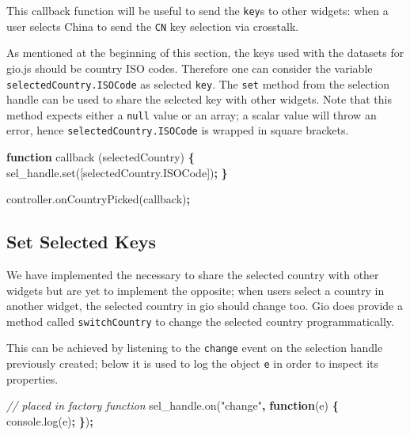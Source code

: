 \documentclass[10pt,]{krantz}
\makeatletter
\newenvironment{Shaded}{\begin{snugshade}}{\end{snugshade}}
\newcommand{\AttributeTok}[1]{\textcolor[rgb]{0.61,0.61,0.61}{#1}}
\newcommand{\CommentTok}[1]{\textcolor[rgb]{0.37,0.37,0.37}{\textit{#1}}}
\newcommand{\KeywordTok}[1]{\textcolor[rgb]{0.27,0.27,0.27}{\textbf{#1}}}
\newcommand{\NormalTok}[1]{#1}
\newcommand{\OperatorTok}[1]{\textcolor[rgb]{0.43,0.43,0.43}{\textbf{#1}}}
\newcommand{\StringTok}[1]{\textcolor[rgb]{0.5,0.5,0.5}{#1}}
\newcommand{\VariableTok}[1]{\textcolor[rgb]{0,0,0}{#1}}
\newenvironment{kframe}{%
\medskip{}
\setlength{\fboxsep}{.8em}
 \def\at@end@of@kframe{}%
 \ifinner\ifhmode%
  \def\at@end@of@kframe{\end{minipage}}%
  \begin{minipage}{\columnwidth}%
 \fi\fi%
 \def\FrameCommand##1{\hskip\@totalleftmargin \hskip-\fboxsep
 \colorbox{shadecolor}{##1}\hskip-\fboxsep
     \hskip-\linewidth \hskip-\@totalleftmargin \hskip\columnwidth}%
 \MakeFramed {\advance\hsize-\width
   \@totalleftmargin\z@ \linewidth\hsize
   \@setminipage}}%
 {\par\unskip\endMakeFramed%
 \at@end@of@kframe}
\renewenvironment{Shaded}{\begin{kframe}}{\end{kframe}}
\makeatother
\begin{document}
This callback function will be useful to send the \texttt{key}s to other widgets: when a user selects China to send the \texttt{CN} key selection via crosstalk.

As mentioned at the beginning of this section, the keys used with the datasets for gio.js should be country ISO codes. Therefore one can consider the variable \texttt{selectedCountry.ISOCode} as selected \texttt{key}. The \texttt{set} method from the selection handle can be used to share the selected key with other widgets. Note that this method expects either a \texttt{null} value or an array; a scalar value will throw an error, hence \texttt{selectedCountry.ISOCode} is wrapped in square brackets.

\begin{Shaded}
\begin{Highlighting}[]
\KeywordTok{function} \AttributeTok{callback}\NormalTok{ (selectedCountry) }\OperatorTok{\{}
  \VariableTok{sel_handle}\NormalTok{.}\AttributeTok{set}\NormalTok{([}\VariableTok{selectedCountry}\NormalTok{.}\AttributeTok{ISOCode}\NormalTok{])}\OperatorTok{;}
\OperatorTok{\}}

\VariableTok{controller}\NormalTok{.}\AttributeTok{onCountryPicked}\NormalTok{(callback)}\OperatorTok{;}
\end{Highlighting}
\end{Shaded}

\hypertarget{linking-widgets-set-keys}{%
\subsection{Set Selected Keys}\label{linking-widgets-set-keys}}

We have implemented the necessary to share the selected country with other widgets but are yet to implement the opposite; when users select a country in another widget, the selected country in gio should change too. Gio does provide a method called \texttt{switchCountry} to change the selected country programmatically.

This can be achieved by listening to the \texttt{change} event on the selection handle previously created; below it is used to log the object \texttt{e} in order to inspect its properties.

\begin{Shaded}
\begin{Highlighting}[]
\CommentTok{// placed in factory function}
\VariableTok{sel_handle}\NormalTok{.}\AttributeTok{on}\NormalTok{(}\StringTok{"change"}\OperatorTok{,} \KeywordTok{function}\NormalTok{(e) }\OperatorTok{\{}
  \VariableTok{console}\NormalTok{.}\AttributeTok{log}\NormalTok{(e)}\OperatorTok{;}
\OperatorTok{\}}\NormalTok{)}\OperatorTok{;}
\end{Highlighting}
\end{Shaded}
\end{document}
